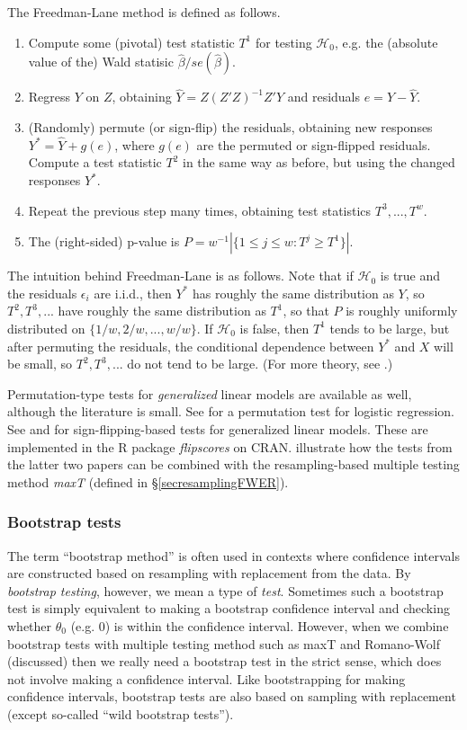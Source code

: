 \documentclass[11pt]{article}
\theoremstyle{plain}
\theoremstyle{definition}
\newcommand{\Hy}{\mathcal{H}}
\newcommand{\citt}{\citet}
\begin{document}
The Freedman-Lane method is defined as follows.
\begin{enumerate}
\item Compute some (pivotal) test statistic $T^1$ for testing $\Hy_0$, e.g. the (absolute value of the) Wald statisic $\hat{\beta}/se(\hat{\beta})$.
\item Regress $Y$ on $Z$, obtaining $\hat{Y}= Z(Z'Z)^{-1}Z'Y$ and residuals $e= Y-\hat{Y}$.
\item (Randomly) permute (or sign-flip) the residuals, obtaining new responses $Y^*=\hat{Y}+g(e)$, where $g(e)$ are the permuted or sign-flipped residuals. Compute a test statistic $T^2$ in the same way as before, but using the changed responses $Y^*$.
\item Repeat the previous step many times, obtaining test statistics $T^3,...,T^w$.
\item The (right-sided) p-value is $P= w^{-1}|\{1\leq j \leq w: T^j\geq T^1\}|$.
\end{enumerate}
The intuition behind Freedman-Lane is as follows. Note that if $\Hy_0$ is true  and the residuals $\epsilon_i$ are i.i.d., then $Y^*$ has roughly the same distribution as $Y$, so $T^2, T^3,...$ have roughly the same distribution as $T^1$, so that $P$ is roughly uniformly distributed on $\{1/w,2/w,...,w/w\}$. If $\Hy_0$ is false, then $T^1$ tends to be large, but after permuting the residuals, the conditional dependence between $Y^*$ and $X$ will be small, so $T^2, T^3,...$ do not tend to be large. (For more theory, see \citealp{anderson2001permutation}.)

Permutation-type tests for \emph{generalized} linear models are available as well, although the literature is small. See \citt{potter2005permutation} for a permutation test for logistic regression.  See \citt{hemerik2020robust} and \citt{de2025inference} for sign-flipping-based tests for generalized linear models. These are implemented in the R package \emph{flipscores} on CRAN. \citt{de2025permutation} illustrate how the tests from the latter two papers can be combined with the resampling-based multiple testing method \emph{maxT} (defined in \S\ref{secresamplingFWER}).

\subsubsection{Bootstrap tests} \label{secboot}
The term ``bootstrap method'' is often used in contexts where confidence intervals are constructed based on resampling with replacement from the data. By \emph{bootstrap testing}, however, we mean a type of \emph{test}. 
Sometimes such a bootstrap test is simply equivalent to making a bootstrap confidence interval and checking whether $\theta_0$ (e.g. 0) is within the confidence interval.
However, when we combine bootstrap tests with multiple testing method such as maxT and Romano-Wolf (discussed) then we really need a bootstrap test in the strict sense, which does not involve making a confidence interval.
Like bootstrapping for making confidence intervals, bootstrap tests are also based on sampling with replacement (except so-called ``wild bootstrap tests'').
\end{document}
